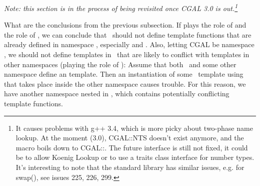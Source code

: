 {\em Note: this section is in the process of being revisited once CGAL 3.0
is out.\footnote{It causes problems with g++ 3.4, which is more picky about
two-phase name lookup.  At the moment (3.0), CGAL::NTS doesn't exist anymore,
and the  macro boils down to CGAL::.  The future interface
is still not fixed, it could be to allow Koenig Lookup or to use a traits
class interface for number types.  It's interesting to note that the standard
library has similar issues, e.g. for swap(), see issues 225, 226, 299.}}

What are the conclusions from the previous subsection. If 
plays the role of  and  the role of \cgal, we can
conclude that \cgal\ should not define template
functions that are already defined in namespace , especially
 and .
Also, letting CGAL be namespace , we should not define 
templates in \cgal\ that are likely to conflict with templates in 
other namespaces (playing the role of ): Assume that both \cgal\
and some other namespace define an  template. 
Then an instantiation of some \cgal\ template using  
that takes place inside the other namespace causes trouble. 
For this reason, we have another namespace %
nested in , which contains potentially conflicting
template functions.


